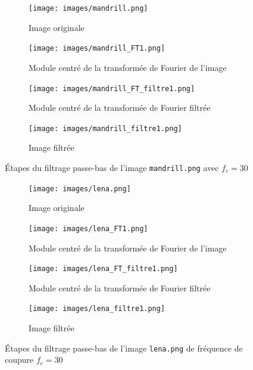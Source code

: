 \documentclass[a4paper]{article}
\begin{document}
\begin{figure}[H]
    \centering
    \begin{subfigure}[c]{0.46\textwidth}
        \centering
        \texttt{[image: images/mandrill.png]}
        \caption{Image originale} 
    \label{subfig:mandrill1}
    \end{subfigure}
    \begin{subfigure}[c]{0.46\textwidth}
        \centering
        \texttt{[image: images/mandrill\_FT1.png]}
        \caption{Module centré de la transformée de Fourier de l'image}
    \label{subfig:mandrill-FT1}
    \end{subfigure}

    \begin{subfigure}[c]{0.46\textwidth}
        \centering
        \texttt{[image: images/mandrill\_FT\_filtre1.png]}
        \caption{Module centré de la transformée de Fourier filtrée} 
        \label{subfig:mandrill-FT-filtre1}
    \end{subfigure}
    \begin{subfigure}[c]{0.46\textwidth}
        \centering
        \texttt{[image: images/mandrill\_filtre1.png]}
        \caption{Image filtrée}
    \label{subfig:mandrill-filtre1}
    \end{subfigure}

    \caption{Étapes du filtrage passe-bas de l'image \texttt{mandrill.png} avec $f_c = 30$}
    \label{fig:filtrage-mandrill1}
\end{figure}

\begin{figure}[H]
    \centering
    \begin{subfigure}[c]{0.46\textwidth}
        \centering
        \texttt{[image: images/lena.png]}
        \caption{Image originale} 
    \label{subfig:lena1}
    \end{subfigure}
    \begin{subfigure}[c]{0.46\textwidth}
        \centering
        \texttt{[image: images/lena\_FT1.png]}
        \caption{Module centré de la transformée de Fourier de l'image}
    \label{subfig:lena-FT1}
    \end{subfigure}

    \begin{subfigure}[c]{0.46\textwidth}
        \centering
        \texttt{[image: images/lena\_FT\_filtre1.png]}
        \caption{Module centré de la transformée de Fourier filtrée} 
    \label{subfig:lena-FT-filtre1}
    \end{subfigure}
    \begin{subfigure}[c]{0.46\textwidth}
        \centering
        \texttt{[image: images/lena\_filtre1.png]}
        \caption{Image filtrée}
    \label{subfig:lena-filtre1}
    \end{subfigure}

    \caption{Étapes du filtrage passe-bas de l'image \texttt{lena.png} de
    fréquence de coupure $f_c = 30$}
    \label{fig:filtrage-lena1}
\end{figure}
\end{document}
